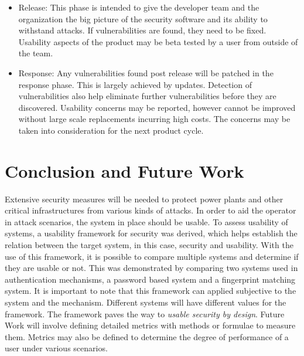 \begin{itemize}
\item Release: This phase is intended to give the developer team and the organization the big picture of the security software and its ability to withstand attacks. If vulnerabilities are found, they need to be fixed. Usability aspects of the product may be beta tested by a user from outside of the team.

\item Response: Any vulnerabilities found post release will be patched in the response phase. This is largely achieved by updates. Detection of vulnerabilities also help eliminate further vulnerabilities before they are discovered. Usability concerns may be reported, however cannot be improved without large scale replacements incurring high costs. The concerns may be taken into consideration for the next product cycle.
\end{itemize} 



\section{Conclusion and Future Work}
Extensive security measures will be needed to protect power plants and other critical infrastructures from various kinds of attacks. In order to aid the operator in attack scenarios, the system in place should be usable. To assess usability of systems, a usability framework for security was derived, which helps establish the relation between the target system, in this case, security and usability.  With the use of this framework, it is possible to compare multiple systems and determine if they are usable or not. This was demonstrated by comparing two systems used in authentication mechanisms, a password based system and a fingerprint matching system. It is important to note that this framework can applied subjective to the system and the mechanism. Different systems will have different values for the framework. The framework paves the way to \textit{usable security by design}. Future Work will involve defining detailed metrics with methods or formulae to measure them. Metrics may also be defined to determine the degree of performance of a user under various scenarios.

